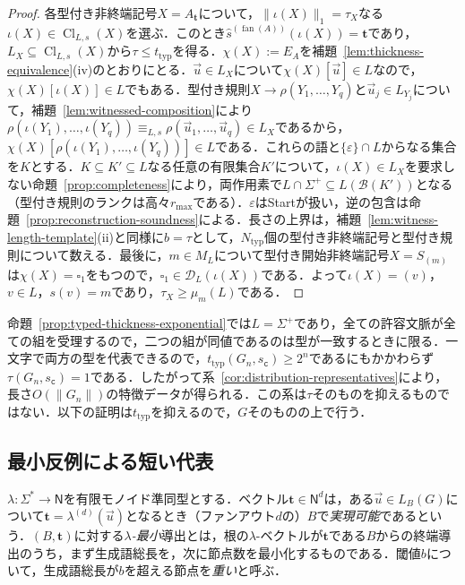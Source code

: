 \documentclass[11pt,a4paper]{ltjsarticle}
\numberwithin{equation}{section}
\theoremstyle{plain}
\theoremstyle{definition}
\theoremstyle{remark}
\newcommand{\D}{\mathcal{D}}
\newcommand{\tuple}[1]{\vec{#1}}
\newcommand{\blank}{\square}
\newcommand{\eps}{\varepsilon}
\newcommand{\fan}{\operatorname{fan}}
\begin{document}
\begin{proof}
各型付き非終端記号$X=A_{\mathbf t}$について，$\|\iota(X)\|_1=\tau_X$なる$\iota(X)\in\operatorname{Cl}_{L,s}(X)$を選ぶ．このとき$\widehat s^{(\fan(A))}(\iota(X))=\mathbf t$であり，$L_X\subseteq\operatorname{Cl}_{L,s}(X)$から$\tau\le t_{\mathrm{typ}}$を得る．$\chi(X):=E_A$を補題~\ref{lem:thickness-equivalence}(iv)のとおりにとる．$\tuple u\in L_X$について$\chi(X)[\tuple u]\in L$なので，$\chi(X)[\iota(X)]\in L$でもある．型付き規則$X\to\rho(Y_1,\ldots,Y_q)$と$\tuple u_j\in L_{Y_j}$について，補題~\ref{lem:witnessed-composition}により$\rho(\iota(Y_1),\ldots,\iota(Y_q))\equiv_{L,s}\rho(\tuple u_1,\ldots,\tuple u_q)\in L_X$であるから，$\chi(X)[\rho(\iota(Y_1),\ldots,\iota(Y_q))]\in L$である．これらの語と$\{\eps\}\cap L$からなる集合を$K$とする．$K\subseteq K'\subseteq L$なる任意の有限集合$K'$について，$\iota(X)\in L_X$を要求しない命題~\ref{prop:completeness}により，両作用素で$L\cap\Sigma^+\subseteq L(\mathcal B(K'))$となる（型付き規則のランクは高々$r_{\max}$である）．$\eps$はStartが扱い，逆の包含は命題~\ref{prop:reconstruction-soundness}による．長さの上界は，補題~\ref{lem:witness-length-template}(ii)と同様に$b=\tau$として，$N_{\mathrm{typ}}$個の型付き非終端記号と型付き規則について数える．最後に，$m\in M_L$について型付き開始非終端記号$X=S_{(m)}$は$\chi(X)=\blank_1$をもつので，$\blank_1\in\D_L(\iota(X))$である．よって$\iota(X)=(v)$，$v\in L$，$s(v)=m$であり，$\tau_X\ge\mu_m(L)$である．
\end{proof}

命題~\ref{prop:typed-thickness-exponential}では$L=\Sigma^+$であり，全ての許容文脈が全ての組を受理するので，二つの組が同値であるのは型が一致するときに限る．一文字で両方の型を代表できるので，$t_{\mathrm{typ}}(G_n,s_{\mathtt c})\ge2^n$であるにもかかわらず$\tau(G_n,s_{\mathtt c})=1$である．したがって系~\ref{cor:distribution-representatives}により，長さ$O(\|G_n\|)$の特徴データが得られる．この系は$\tau$そのものを抑えるものではない．以下の証明は$t_{\mathrm{typ}}$を抑えるので，$G$そのものの上で行う．

\subsection{最小反例による短い代表}
\label{subsec:group-invariants}

$\lambda:\Sigma^*\to\mathsf N$を有限モノイド準同型とする．ベクトル$\mathbf t\in\mathsf N^d$は，ある$\tuple u\in L_B(G)$について$\mathbf t=\lambda^{(d)}(\tuple u)$となるとき（ファンアウト$d$の）$B$で\emph{実現可能}であるという．$(B,\mathbf t)$に対する\emph{$\lambda$-最小}導出とは，根の$\lambda$-ベクトルが$\mathbf t$である$B$からの終端導出のうち，まず生成語総長を，次に節点数を最小化するものである．閾値$b$について，生成語総長が$b$を超える節点を\emph{重い}と呼ぶ．
\end{document}

